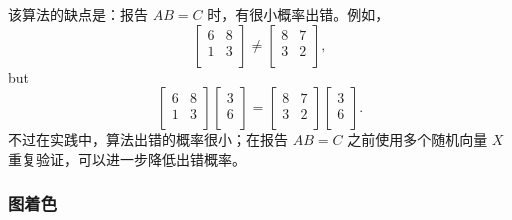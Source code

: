 该算法的缺点是：报告 $AB=C$ 时，有很小概率出错。例如，
\[
 \begin{bmatrix}
  6 & 8 \\
  1 & 3 \\
 \end{bmatrix}
\neq
 \begin{bmatrix}
  8 & 7 \\
  3 & 2 \\
 \end{bmatrix},
\]
but
\[
 \begin{bmatrix}
  6 & 8 \\
  1 & 3 \\
 \end{bmatrix}
 \begin{bmatrix}
  3 \\
  6 \\
 \end{bmatrix}
=
 \begin{bmatrix}
  8 & 7 \\
  3 & 2 \\
 \end{bmatrix}
 \begin{bmatrix}
  3 \\
  6 \\
 \end{bmatrix}.
\]
不过在实践中，算法出错的概率很小；在报告 $AB=C$ 之前使用多个随机向量 $X$ 重复验证，可以进一步降低出错概率。

\subsubsection{图着色}



